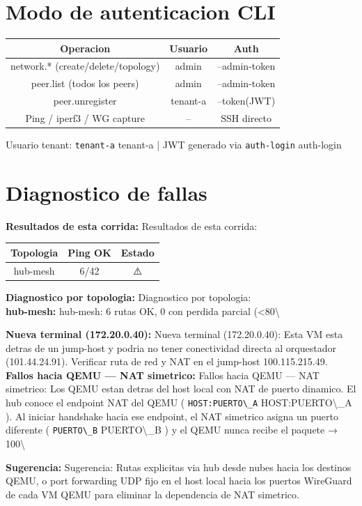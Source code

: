 \documentclass[11pt,a4paper]{article}
\begin{document}
\section{Modo de autenticacion CLI}
\begin{longtable}{|c|c|c|}
\hline
Operacion & Usuario & Auth \\ \hline
network.* (create/delete/topology) & admin & --admin-token \\ \hline
peer.list (todos los peers) & admin & --admin-token \\ \hline
peer.unregister & tenant-a & --token(JWT) \\ \hline
Ping / iperf3 / WG capture & -- & SSH directo \\ \hline
\end{longtable}

Usuario tenant:  \texttt{tenant-a} tenant-a  | JWT generado via  \texttt{auth-login} auth-login\\

\section{Diagnostico de fallas}
\textbf{Resultados de esta corrida:} Resultados de esta corrida:\\

\begin{longtable}{|c|c|c|}
\hline
Topologia & Ping OK & Estado \\ \hline
hub-mesh & 6/42 & ⚠️ \\ \hline
\end{longtable}

\textbf{Diagnostico por topologia:} Diagnostico por topologia:\\

\textbf{hub-mesh:} hub-mesh:  6 rutas OK, 0 con perdida parcial (<80\textbackslash{}%

\textbf{Nueva terminal (172.20.0.40):} Nueva terminal (172.20.0.40):  Esta VM esta detras de un jump-host y podria no tener conectividad directa al orquestador (101.44.24.91). Verificar ruta de red y NAT en el jump-host 100.115.215.49.\\

\textbf{Fallos hacia QEMU — NAT simetrico:} Fallos hacia QEMU — NAT simetrico:  Los QEMU estan detras del host local con NAT de puerto dinamico. El hub conoce el endpoint NAT del QEMU ( \texttt{HOST:PUERTO\textbackslash{}_A} HOST:PUERTO\textbackslash{}_A ). Al iniciar handshake hacia ese endpoint, el NAT simetrico asigna un puerto diferente ( \texttt{PUERTO\textbackslash{}_B} PUERTO\textbackslash{}_B ) y el QEMU nunca recibe el paquete → 100\textbackslash{}%

\textbf{Sugerencia:} Sugerencia:  Rutas explicitas via hub desde nubes hacia los destinos QEMU, o port forwarding UDP fijo en el host local hacia los puertos WireGuard de cada VM QEMU para eliminar la dependencia de NAT simetrico.\\
\end{document}
